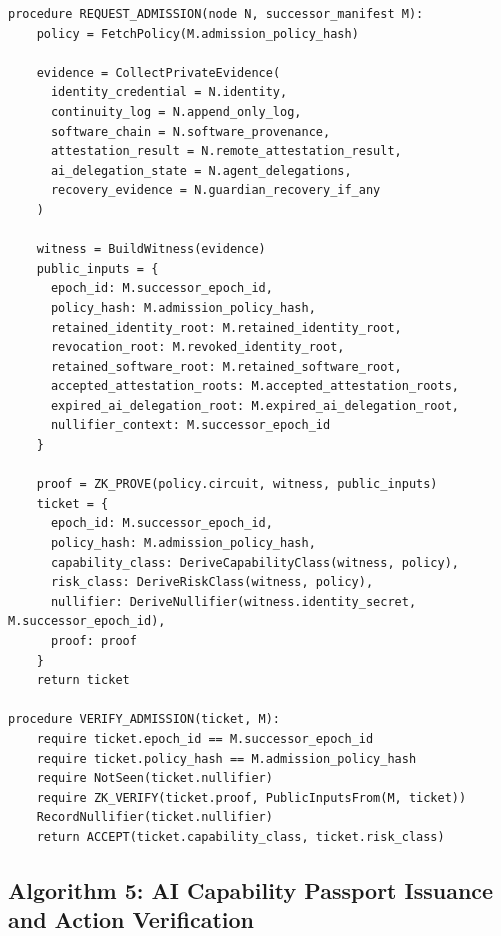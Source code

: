 \documentclass[11pt,letterpaper]{article}
\begin{document}
\begin{lstlisting}[caption={zk-attested admission}]
procedure REQUEST_ADMISSION(node N, successor_manifest M):
    policy = FetchPolicy(M.admission_policy_hash)

    evidence = CollectPrivateEvidence(
      identity_credential = N.identity,
      continuity_log = N.append_only_log,
      software_chain = N.software_provenance,
      attestation_result = N.remote_attestation_result,
      ai_delegation_state = N.agent_delegations,
      recovery_evidence = N.guardian_recovery_if_any
    )

    witness = BuildWitness(evidence)
    public_inputs = {
      epoch_id: M.successor_epoch_id,
      policy_hash: M.admission_policy_hash,
      retained_identity_root: M.retained_identity_root,
      revocation_root: M.revoked_identity_root,
      retained_software_root: M.retained_software_root,
      accepted_attestation_roots: M.accepted_attestation_roots,
      expired_ai_delegation_root: M.expired_ai_delegation_root,
      nullifier_context: M.successor_epoch_id
    }

    proof = ZK_PROVE(policy.circuit, witness, public_inputs)
    ticket = {
      epoch_id: M.successor_epoch_id,
      policy_hash: M.admission_policy_hash,
      capability_class: DeriveCapabilityClass(witness, policy),
      risk_class: DeriveRiskClass(witness, policy),
      nullifier: DeriveNullifier(witness.identity_secret, M.successor_epoch_id),
      proof: proof
    }
    return ticket

procedure VERIFY_ADMISSION(ticket, M):
    require ticket.epoch_id == M.successor_epoch_id
    require ticket.policy_hash == M.admission_policy_hash
    require NotSeen(ticket.nullifier)
    require ZK_VERIFY(ticket.proof, PublicInputsFrom(M, ticket))
    RecordNullifier(ticket.nullifier)
    return ACCEPT(ticket.capability_class, ticket.risk_class)
\end{lstlisting}

\subsection{Algorithm 5: AI Capability Passport Issuance and Action Verification}
\end{document}
